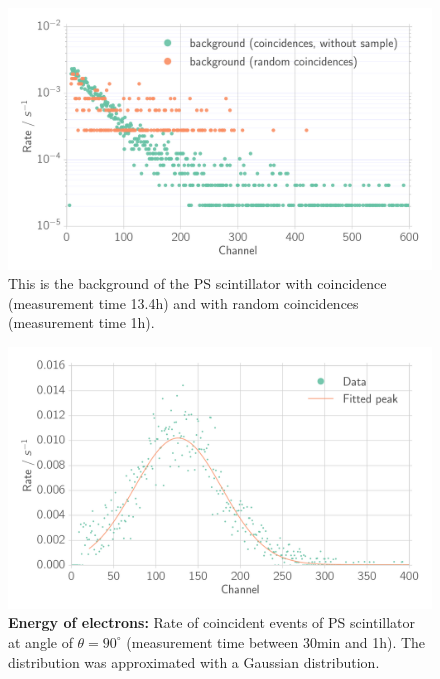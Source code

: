 \begin{figure}[htpb]
    \centering
    \includegraphics[width=0.9\linewidth]{./analysis/figures/coin_background_random}
    \caption{This is the background of the PS scintillator with coincidence
        (measurement time 13.4h)  
 and with random coincidences (measurement time 1h).}
\label{fig:coin_ps_background}
\end{figure}

\begin{figure}[htpb]
    \centering
    \includegraphics[width=0.9\linewidth]{./analysis/figures/coin_ps_90}
    \caption{\textbf{Energy of electrons:}
    Rate of coincident events of PS scintillator at angle of $\theta = 90^\circ$ 
        (measurement time between 30min and 1h). The distribution 
    was approximated with a Gaussian distribution. }
\label{fig:coin_ps_90}
\end{figure}

